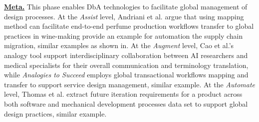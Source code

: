 \textbf{\underline{Meta.}}
This phase enables DbA technologies to facilitate global management of design processes. At the \textit{Assist} level, Andriani et al. argue that using mapping method can facilitate end-to-end perfume production workflows transfer to global practices in wine-making provide an example for automation the supply chain migration\cite{andriani2025perfume}, similar examples as shown in\cite{you2018design, song2020exploration}. At the \textit{Augment} level, Cao et al.'s analogy tool support interdisciplinary collaboration between AI researchers and medical specialists for their overall communication and terminology translation\cite{cao2025medai}, while \textit{Analogies to Succeed} employs global transactional workflows mapping and transfer to support service design management\cite{moreno2014analogies}, similar example\cite{karunathilaka2025intuit, wills1994towards, bettin2023pedagogical, li2010agentsinternational}. At the \textit{Automate} level, Thomas et al. extract future iteration requirements for a product across both software and mechanical development processes data set to support global design practices\cite{thomas2013extending}, similar example\cite{yu2016distributed, bitton2023vasr, lupiani2017monitoring}.


